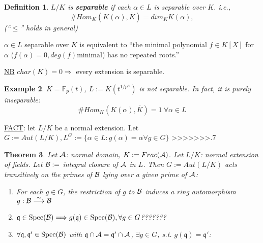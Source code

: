 \documentclass[11pt]{article}
\newtheorem{thm}{Theorem}[section]
\newtheorem{dfn}[thm]{Definition}
\newtheorem{ex}[thm]{Example}
\newcommand{\bbf}{\mathbb F}
\newcommand{\scq}{\mathfrak q}
\newcommand{\cala}{{\cal A}}
\newcommand{\calb}{{\cal B}}
\newcommand{\Lrta}{\Longrightarrow}
\newcommand{\lrta}{\longrightarrow}
\begin{document}
\begin{dfn}
$L/K$ is \textbf{separable} if each $\alpha\in L$ is separable over $K$. i.e.,
$$
\# Hom_K(K(\alpha),\overline{K})=dim_K K(\alpha),
$$
(``$\leq$'' holds in general)
\end{dfn}
$\alpha\in L$ separable over $K$ is equivalent to ``the minimal polynomial $f\in K[X]$ for $\alpha$ ($f(\alpha)=0, deg(f)\text{minimal}$) has no repeated roots.''

\underline{NB} $char(K)=0\Lrta$ every extension is separable.

\begin{ex}
$K=\bbf_p(t)$, $L:=K(t^{1/p^n})$ is not separable. In fact, it is purely inseparable: 
$$
\#Hom_K(K(\alpha),\overline{K})=1\ \forall \alpha\in L
$$
\end{ex}

\underline{FACT}: let $L/K$ be a normal extension. Let $G:=Aut(L/K), L^G:=\{\alpha\in L:g(\alpha)=\alpha\forall g\in G\}$
>>>>>>>.7


\begin{thm}\label{thm:normal_domain_normal_Galois}
Let $\cala$: normal domain, $K:=Frac(\cala)$.
Let $L/K$: normal extension of fields. Let $\calb:=$ integral closure of $\cala$ in $L$. Then $G:=Aut(L/K)$ acts transitively on the primes of $\calb$ lying over a given prime of $\cala$:
\begin{enumerate}[label=(\roman*)]
\item For each $g\in G$, the restriction of $g$ to $\calb$ induces a ring automorphism $g:\calb\overset{\sim}{\lrta}\calb$

\item $\scq\in \text{Spec}(\calb)\Lrta g(\scq)\in \text{Spec}(\calb), \forall g\in G$???????

\item $\forall \scq,\scq'\in \text{Spec}(\calb)$ with $\scq\cap\cala=\scq'\cap\cala$, $\exists g\in G$, s.t. $g(\scq)=\scq'$:
\end{enumerate}
\end{thm}
\end{document}
